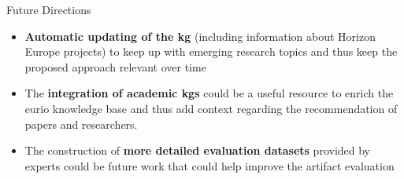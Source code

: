 \begin{tframe}{Future Directions}
    \begin{itemize}
        \item \textbf{Automatic updating of the \gls{kg}} (including information about Horizon Europe projects) to keep up with emerging research topics and thus keep the proposed approach relevant over time
        \item The \textbf{integration of academic \glspl{kg}} could be a useful resource to enrich the \gls{eurio} knowledge base and thus add context regarding the recommendation of papers and researchers.
        \item The construction of \textbf{more detailed evaluation datasets} provided by experts could be future work that could help improve the artifact evaluation
    \end{itemize}
\end{tframe}